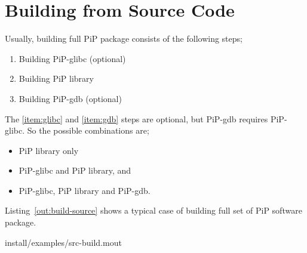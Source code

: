 
\section{Building from Source Code}

Usually, building full PiP package consists of the following steps;

\begin{enumerate}
\item Building PiP-glibc (optional)\label{item:glibc}
\item Building PiP library
\item Building PiP-gdb (optional)\label{item:gdb}
\end{enumerate}

The \ref{item:glibc} and \ref{item:gdb} steps are optional, but
PiP-gdb requires PiP-glibc. So the possible combinations are;

\begin{itemize}
\item PiP library only
\item PiP-glibc and PiP library, and
\item PiP-glibc, PiP library and PiP-gdb.
\end{itemize}

Listing~\ref{out:build-source} shows a typical case of building full
set of PiP software package. 


                {install/examples/src-build.mout}
